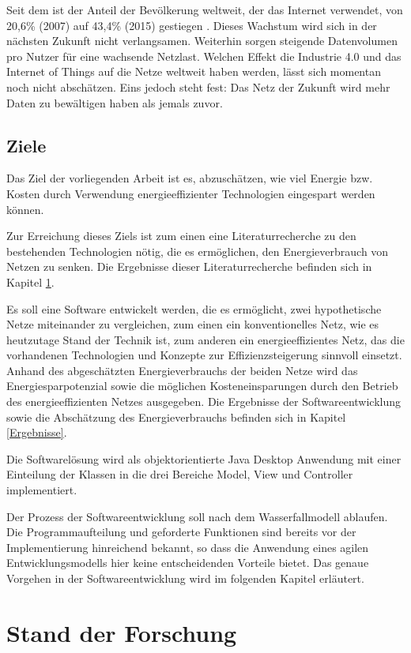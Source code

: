 \documentclass[12pt,titlepage]{article}
\begin{document}
Seit dem ist der Anteil der Bevölkerung weltweit, der das Internet verwendet, von 20,6\% (2007) auf 43,4\% (2015) gestiegen \cite{itu}. Dieses Wachstum wird sich in der nächsten Zukunft nicht verlangsamen. Weiterhin sorgen steigende Datenvolumen pro Nutzer für eine wachsende Netzlast. Welchen Effekt die Industrie 4.0 und das Internet of Things auf die Netze weltweit haben werden, lässt sich momentan  noch nicht abschätzen. Eins jedoch steht fest: Das Netz der Zukunft wird mehr Daten zu bewältigen haben als jemals zuvor.

\subsection{Ziele}
Das Ziel der vorliegenden Arbeit ist es, abzuschätzen, wie viel Energie bzw. Kosten  durch Verwendung energieeffizienter Technologien eingespart werden können.

Zur Erreichung dieses Ziels ist zum einen eine Literaturrecherche zu den bestehenden Technologien nötig, die es ermöglichen, den Energieverbrauch von Netzen zu senken. Die Ergebnisse dieser Literaturrecherche befinden sich in Kapitel \ref{SdF}.

Es soll eine Software entwickelt werden, die es ermöglicht, zwei hypothetische Netze miteinander zu vergleichen, zum einen ein konventionelles Netz, wie es heutzutage Stand der Technik ist, zum anderen ein energieeffizientes Netz, das die vorhandenen Technologien und Konzepte zur Effizienzsteigerung sinnvoll einsetzt. Anhand des abgeschätzten Energieverbrauchs der beiden Netze wird das Energiesparpotenzial sowie die möglichen Kosteneinsparungen durch den Betrieb des energieeffizienten Netzes ausgegeben. Die Ergebnisse der Softwareentwicklung sowie die Abschätzung des Energieverbrauchs befinden sich in Kapitel \ref{Ergebnisse}.

Die Softwarelösung wird als objektorientierte Java Desktop Anwendung mit einer Einteilung der Klassen in die drei Bereiche Model, View und Controller implementiert.

Der Prozess der Softwareentwicklung soll nach dem Wasserfallmodell ablaufen. Die Programmaufteilung und geforderte Funktionen sind bereits vor der Implementierung hinreichend bekannt, so dass die Anwendung eines agilen Entwicklungsmodells hier keine entscheidenden Vorteile bietet. Das genaue Vorgehen in der Softwareentwicklung wird im folgenden Kapitel erläutert.


\section{Stand der Forschung} \label{SdF}
\end{document}
